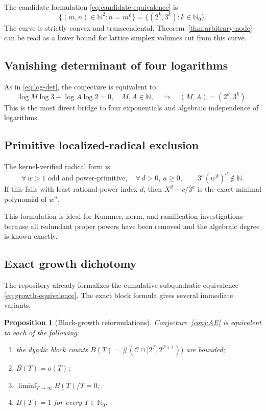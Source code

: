 \documentclass[11pt,oneside]{article}
\newtheorem{proposition}[theorem]{Proposition}
\theoremstyle{definition}
\theoremstyle{remark}
\newcommand{\N}{\mathbb N}
\newcommand{\Nzero}{\mathbb N_0}
\newcommand{\thetaq}{\vartheta}
\newcommand{\Cand}{\mathcal C}
\begin{document}
The candidate formulation \eqref{eq:candidate-equivalence} is
\begin{equation}
 \{(m,n)\in\N^2:n=m^{\thetaq}\}
 =\{(2^k,3^k):k\in\Nzero\}.
 \label{eq:lattice-curve}
\end{equation}
The curve is strictly convex and transcendental.  Theorem~\ref{thm:arbitrary-node} can be read
as a lower bound for lattice simplex volumes cut from this curve.

\subsection{Vanishing determinant of four logarithms}

As in \eqref{eq:log-det}, the conjecture is equivalent to
\begin{equation}
 \log M\log3-\log A\log2=0,
 \quad M,A\in\N,
 \quad\Longrightarrow\quad
 (M,A)=(2^k,3^k).
 \label{eq:four-log-form}
\end{equation}
This is the most direct bridge to four exponentials and algebraic independence of logarithms.

\subsection{Primitive localized-radical exclusion}

The kernel-verified radical form is
\begin{equation}
 \forall\,w>1\text{ odd and power-primitive},\quad
 \forall\,d>0,\ a\ge0,\qquad
 3^a(w^{\thetaq})^d\notin\N.
 \label{eq:primitive-localized}
\end{equation}
If this fails with least rational-power index $d$, then
$X^d-c/3^a$ is the exact minimal polynomial of $w^{\thetaq}$.

This formulation is ideal for Kummer, norm, and ramification investigations because all
redundant proper powers have been removed and the algebraic degree is known exactly.

\subsection{Exact growth dichotomy}

The repository already formalizes the cumulative subquadratic equivalence
\eqref{eq:growth-equivalence}.  The exact block formula gives several immediate variants.

\begin{proposition}[Block-growth reformulations]
\label{prop:block-reforms}
Conjecture~\ref{conj:AE} is equivalent to each of the following:
\begin{enumerate}
\item the dyadic block counts
$B(T)=\#(\Cand\cap[2^T,2^{T+1}))$ are bounded;
\item $B(T)=o(T)$;
\item $\liminf_{T\to\infty}B(T)/T=0$;
\item $B(T)=1$ for every $T\in\Nzero$.
\end{enumerate}
\end{proposition}
\end{document}
